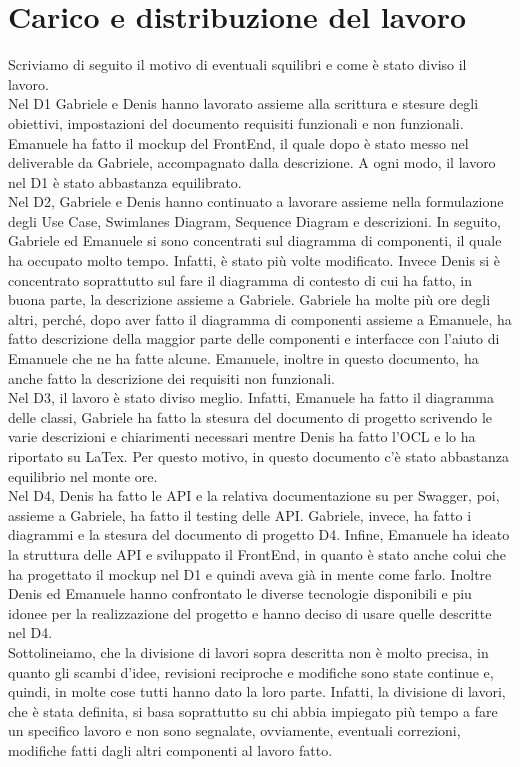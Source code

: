 \documentclass{article}
\begin{document}
\section{Carico e distribuzione del lavoro}

Scriviamo di seguito il motivo di eventuali squilibri e come è stato diviso il lavoro.\\
Nel D1 Gabriele e Denis hanno lavorato assieme alla scrittura e stesure degli obiettivi, impostazioni del documento requisiti funzionali e non funzionali. Emanuele ha fatto il mockup del FrontEnd, il quale dopo è stato messo nel deliverable da Gabriele, accompagnato dalla descrizione. A ogni modo, il lavoro nel D1 è stato abbastanza equilibrato. \\
Nel D2, Gabriele e Denis hanno continuato a lavorare assieme nella formulazione degli Use Case, Swimlanes Diagram, Sequence Diagram e descrizioni.
In seguito, Gabriele ed Emanuele si sono concentrati sul diagramma di componenti, il quale ha occupato molto tempo. Infatti, è stato più volte modificato. Invece Denis si è concentrato soprattutto sul fare il diagramma di contesto di cui ha fatto, in buona parte, la descrizione assieme a Gabriele. Gabriele ha molte più ore degli altri, perché, dopo aver fatto il diagramma di componenti assieme a Emanuele, ha fatto descrizione della maggior parte delle componenti e interfacce con l'aiuto di Emanuele che ne ha fatte alcune. Emanuele, inoltre in questo documento, ha anche fatto la descrizione dei requisiti non funzionali.\\
Nel D3, il lavoro è stato diviso meglio. Infatti, Emanuele ha fatto il diagramma delle classi, Gabriele ha fatto la stesura del documento di progetto scrivendo le varie descrizioni e chiarimenti necessari mentre Denis ha fatto l'OCL e lo ha riportato su LaTex. Per questo motivo, in questo documento c'è stato abbastanza equilibrio nel monte ore.\\
Nel D4, Denis ha fatto le API e la relativa documentazione su per Swagger, poi, assieme a Gabriele, ha fatto il testing delle API. Gabriele, invece, ha fatto i diagrammi e la stesura del documento di progetto D4. Infine, Emanuele ha ideato la struttura delle API e sviluppato il FrontEnd, in quanto è stato anche colui che ha progettato il mockup nel D1 e quindi aveva già in mente come farlo. Inoltre Denis ed Emanuele hanno confrontato le diverse tecnologie disponibili e piu idonee per la realizzazione del progetto e hanno deciso di usare quelle descritte nel D4.\\
Sottolineiamo, che la divisione di lavori sopra descritta non è molto precisa, in quanto gli scambi d'idee, revisioni reciproche e modifiche sono state continue e, quindi, in molte cose tutti hanno dato la loro parte. Infatti, la divisione di lavori, che è stata definita, si basa soprattutto su chi abbia impiegato più tempo a fare un specifico lavoro e non sono segnalate, ovviamente, eventuali correzioni, modifiche fatti dagli altri componenti al lavoro fatto.
\end{document}
